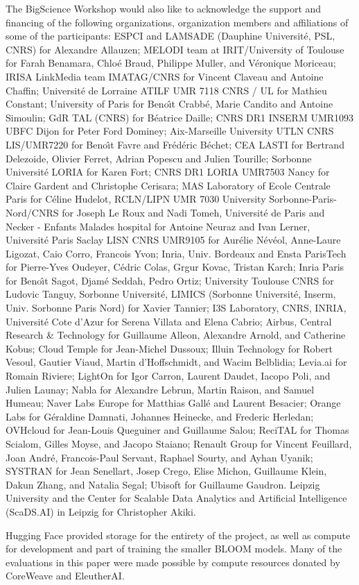 \begin{acks}
The BigScience Workshop would also like to acknowledge the support and financing of the following organizations, organization members and affiliations of some of the participants: ESPCI and LAMSADE (Dauphine Universit\'e, PSL, CNRS) for Alexandre Allauzen; MELODI team at IRIT/University of Toulouse for Farah Benamara, Chlo\'e Braud, Philippe Muller, and V\'eronique Moriceau; IRISA LinkMedia team IMATAG/CNRS for Vincent Claveau and Antoine Chaffin; Universit\'e de Lorraine ATILF UMR 7118 CNRS / UL for Mathieu Constant; University of Paris for Beno\^\i t Crabb\'e, Marie Candito and Antoine Simoulin; GdR TAL (CNRS) for B\'eatrice Daille; CNRS DR1 INSERM UMR1093 UBFC Dijon for Peter Ford Dominey; Aix-Marseille University UTLN CNRS LIS/UMR7220 for Beno\^\i t Favre and Fr\'ed\'eric B\'echet; CEA LASTI for Bertrand Delezoide, Olivier Ferret, Adrian Popescu and Julien Tourille; Sorbonne Universit\'e LORIA for Karen Fort; CNRS DR1 LORIA UMR7503 Nancy for Claire Gardent and Christophe Cerisara; MAS Laboratory of Ecole Centrale Paris for C\'eline Hudelot, RCLN/LIPN UMR 7030 University Sorbonne-Paris-Nord/CNRS for Joseph Le Roux and Nadi Tomeh, Universit\'e de Paris and Necker - Enfants Malades hospital for Antoine Neuraz and Ivan Lerner, Universit\'e Paris Saclay LISN CNRS UMR9105 for Aur\'elie N\'ev\'eol, Anne-Laure Ligozat, Caio Corro, Francois Yvon; Inria, Univ. Bordeaux and Ensta ParisTech for Pierre-Yves Oudeyer, C\'edric Colas, Grgur Kovac, Tristan Karch; Inria Paris for Beno\^\i t Sagot, Djam\'e Seddah, Pedro Ortiz; University Toulouse CNRS for Ludovic Tanguy, Sorbonne Universit\'e, LIMICS (Sorbonne Universit\'e, Inserm, Univ. Sorbonne Paris Nord) for Xavier Tannier; I3S Laboratory, CNRS, INRIA, Universit\'e Cote d’Azur for Serena Villata and Elena Cabrio; Airbus, Central Research \& Technology for Guillaume Alleon, Alexandre Arnold, and Catherine Kobus; Cloud Temple for Jean-Michel Dussoux; Illuin Technology for Robert Vesoul, Gautier Viaud, Martin d’Hoffschmidt, and Wacim Belblidia; Levia.ai for Romain Riviere; LightOn for Igor Carron, Laurent Daudet, Iacopo Poli, and Julien Launay; Nabla for Alexandre Lebrun, Martin Raison, and Samuel Humeau; Naver Labs Europe for Matthias Gall\'e and Laurent Besacier; Orange Labs for G\'eraldine Damnati, Johannes Heinecke, and Frederic Herledan; OVHcloud for Jean-Louis Queguiner and Guillaume Salou; ReciTAL for Thomas Scialom, Gilles Moyse, and Jacopo Staiano; Renault Group for Vincent Feuillard, Joan Andr\'e, Francois-Paul Servant, Raphael Sourty, and Ayhan Uyanik; SYSTRAN for Jean Senellart, Josep Crego, Elise Michon, Guillaume Klein, Dakun Zhang, and Natalia Segal; Ubisoft for Guillaume Gaudron. Leipzig University and the Center for Scalable Data Analytics and Artificial Intelligence (ScaDS.AI) in Leipzig for Christopher Akiki.

Hugging Face provided storage for the entirety of the project, as well as compute for development and part of training the smaller BLOOM models. Many of the evaluations in this paper were made possible by compute resources donated by CoreWeave and EleutherAI.
\end{acks}

\vskip 0.2in


